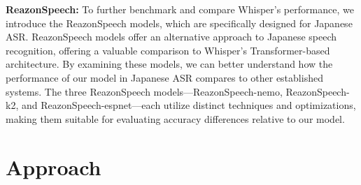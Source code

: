 \documentclass[10pt,twocolumn,letterpaper]{article}
\begin{document}
\textbf{ReazonSpeech:}
To further benchmark and compare Whisper’s performance, we introduce the ReazonSpeech models, which are specifically designed for Japanese ASR. ReazonSpeech models offer an alternative approach to Japanese speech recognition, offering a valuable comparison to Whisper’s Transformer-based architecture. By examining these models, we can better understand how the performance of our model in Japanese ASR compares to other established systems. The three ReazonSpeech models—ReazonSpeech-nemo\cite{ReazonSpeechNemo}, ReazonSpeech-k2\cite{ReazonSpeechK2}, and ReazonSpeech-espnet\cite{ReazonSpeechESPNet}—each utilize distinct techniques and optimizations, making them suitable for evaluating accuracy differences relative to our model.

\section{Approach}
\end{document}
